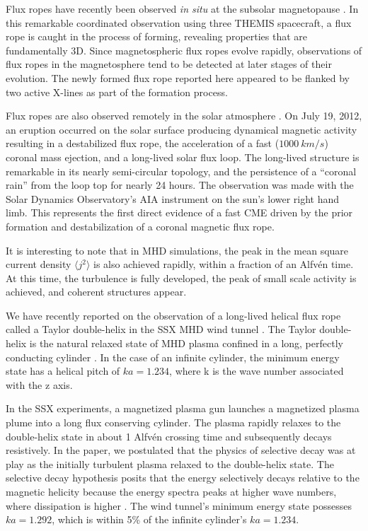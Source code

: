 \documentclass[12pt]{iopart}
\begin{document}
Flux ropes have recently been observed {\it in situ} at the subsolar magnetopause \cite{Oieroset11}.  In this remarkable coordinated observation using three THEMIS spacecraft, a flux rope is caught in the process of forming, revealing properties that are fundamentally 3D. Since magnetospheric flux ropes evolve rapidly, observations of flux ropes in the magnetosphere tend to be detected at later stages of their evolution.  The newly formed flux rope reported here appeared to be flanked by two active X-lines as part of the formation process.

Flux ropes are also observed remotely in the solar atmosphere \cite{Patsourakos13}.  On July 19, 2012, an eruption occurred on the solar surface producing dynamical magnetic activity resulting in a destabilized flux rope, the acceleration of a fast ($1000~km/s$) coronal mass ejection, and a long-lived solar flux loop.  The long-lived structure is remarkable in its nearly semi-circular topology, and the persistence of a ``coronal rain'' from the loop top for nearly 24 hours.  The observation was made with the Solar Dynamics Observatory's AIA instrument on the sun's lower right hand limb.   This represents the first direct evidence of a fast CME driven by the prior formation and destabilization of a coronal magnetic flux rope.

It is interesting to note that in MHD simulations, the peak in the mean square current density $\langle j^2 \rangle$ is also achieved rapidly, within a fraction of an Alfv\'en time. At this time, the turbulence is fully developed, the peak of small scale activity is achieved, and coherent structures appear. 

We have recently reported on the observation of a long-lived helical flux rope called a Taylor double-helix in the SSX MHD wind tunnel \cite{Gray13}.  The Taylor double-helix is the natural relaxed state of MHD plasma confined in a long, perfectly conducting cylinder \cite{Taylor86}.  In the case of an infinite cylinder, the minimum energy state has a helical pitch of $ ka = 1.234$, where k is the wave number associated with the z axis.  

In the SSX experiments, a magnetized plasma gun launches a magnetized plasma plume into a long flux conserving cylinder.  The plasma rapidly relaxes to the double-helix state in about 1 Alfv\'en crossing time and subsequently decays resistively.  In the paper, we postulated that the physics of selective decay was at play as the initially turbulent plasma relaxed to the double-helix state.  The selective decay hypothesis posits that the energy selectively decays relative to the magnetic helicity because the energy spectra peaks at higher wave numbers, where dissipation is higher \cite{Matthaeus80}.  The wind tunnel's minimum energy state possesses $ka = 1.292$, which is within 5\% of the infinite cylinder's $ka = 1.234$. 
\end{document}
